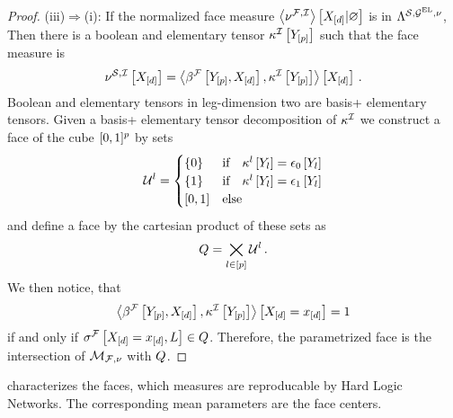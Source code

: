 \begin{proof}
    (iii)$\Rightarrow$(i):
    If the normalized face measure $\left\langle \nu^{\mathcal{F},\mathcal{I}}\right\rangle \left[ X_{[d]} | \varnothing \right]$ is in $\Lambda^{\mathcal{S},\mathcal{G}^{\mathrm{EL}},\nu}$,
    Then there is a boolean and elementary tensor $\kappa^{\mathcal{I}}\left[Y_{[p]}\right]$ such that the face measure is
    \begin{align*}
        \nu^{\mathcal{S},\mathcal{I}}\left[X_{[d]}\right]
        = \left\langle \beta^{\mathcal{F}}\left[Y_{[p]},X_{[d]}\right],\kappa^{\mathcal{I}}\left[Y_{[p]}\right]\right\rangle \left[ X_{[d]} \right] \, .
    \end{align*}
    Boolean and elementary tensors in leg-dimension two are basis+ elementary tensors.
    Given a basis+ elementary tensor decomposition of $\kappa^{\mathcal{I}}$ we construct a face of the cube $[0,1]^{p}$ by sets
    \begin{align*}
        \mathcal{U}^{l} = \begin{cases}
                                   \{0\} & \text{if} \quad \kappa^{l}\left[Y_{l}\right] = \epsilon_0\left[Y_{l}\right] \\
                                   \{1\} & \text{if} \quad \kappa^{l}\left[Y_{l}\right] = \epsilon_1\left[Y_{l}\right] \\
                                   [0,1] & \text{else}
        \end{cases}
    \end{align*}
    and define a face by the cartesian product of these sets as
    \begin{align*}
        Q = \bigtimes_{l\in[p]} \mathcal{U}^{l} \, .
    \end{align*}
    We then notice, that
    \begin{align*}
        \left\langle \beta^{\mathcal{F}}\left[Y_{[p]},X_{[d]}\right],\kappa^{\mathcal{I}}\left[Y_{[p]}\right]\right\rangle \left[ X_{[d]}=x_{[d]} \right] = 1
    \end{align*}
    if and only if $\sigma^{\mathcal{F}}\left[X_{[d]}=x_{[d]},L\right]\in Q$.
    Therefore, the parametrized face is the intersection of $\mathcal{M}_{\mathcal{F},\nu}$ with $Q$.
\end{proof}

 characterizes the faces, which measures are reproducable by Hard Logic Networks.
The corresponding mean parameters are the face centers.


